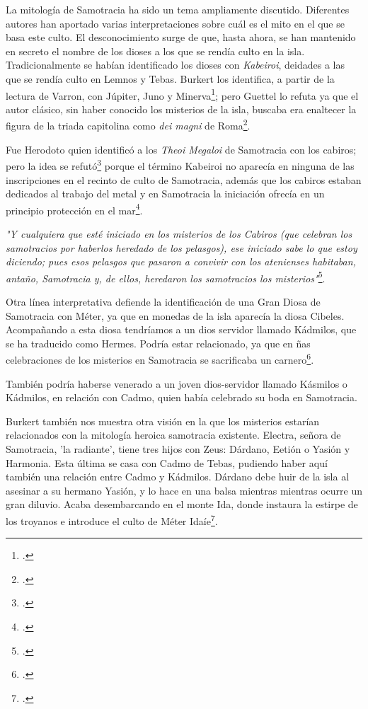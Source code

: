 La mitología de Samotracia ha sido un tema ampliamente discutido. Diferentes autores han aportado varias interpretaciones sobre cuál es el mito en el que se basa este culto. El desconocimiento surge de que, hasta ahora, se han mantenido en secreto  el nombre de los dioses a los que se rendía culto en la isla. Tradicionalmente se habían identificado los dioses con \textit{Kabeiroi}, deidades a las que se rendía culto en Lemnos y Tebas. 
Burkert los identifica, a partir de la lectura de Varron, con Júpiter, Juno y Minerva\footcite[377]{burkertReligionGriegaArcaica2007}; pero Guettel lo refuta ya que el autor clásico, sin haber conocido los misterios de la isla, buscaba era enaltecer la figura de la triada capitolina como \textit{dei magni} de Roma\footcite[2-3]{guettelcoleTheoiMegaloiCult1984}.

Fue Herodoto quien identificó a los \textit{Theoi Megaloi} de Samotracia con los cabiros; pero la idea se refutó\footcite[377]{burkertReligionGriegaArcaica2007} porque el término Kabeiroi no aparecía en ninguna de las inscripciones en el recinto de culto de Samotracia, además que los cabiros estaban dedicados al trabajo del metal y en Samotracia la iniciación ofrecía en un principio protección en el mar\footcite[2-3]{guettelcoleTheoiMegaloiCult1984}.

\textit{"Y cualquiera que esté iniciado en los misterios de los Cabiros (que celebran los samotracios por haberlos heredado de los pelasgos), ese iniciado sabe lo que estoy diciendo; pues esos pelasgos que pasaron a convivir con los atenienses habitaban, antaño, Samotracia y, de ellos, heredaron los samotracios los misterios"}\footcite[341]{herodotoHistoriaLibroII1992}.

Otra línea interpretativa defiende la identificación de una Gran Diosa de Samotracia con Méter, ya que en monedas de la isla aparecía la diosa Cibeles. Acompañando a esta diosa tendríamos a un dios servidor llamado Kádmilos, que se ha traducido como Hermes. Podría estar relacionado, ya que en ñas celebraciones de los misterios en Samotracia se sacrificaba un carnero\footcite[378]{burkertReligionGriegaArcaica2007}.

También podría haberse venerado a un joven dios-servidor llamado Kásmilos o Kádmilos, en relación con Cadmo, quien había celebrado su boda en Samotracia.

Burkert también nos muestra otra visión en la que los misterios estarían relacionados con la mitología heroica samotracia existente. Electra, señora de Samotracia, 'la radiante', tiene tres hijos con Zeus: Dárdano, Eetión o Yasión y Harmonia. Esta última se casa con Cadmo de Tebas, pudiendo haber aquí también una relación entre Cadmo y Kádmilos. Dárdano debe huir de la isla al asesinar a su hermano Yasión, y lo hace en una balsa mientras mientras ocurre un gran diluvio. Acaba desembarcando en el monte Ida, donde instaura la estirpe de los troyanos e introduce el culto de Méter Idaíe\footcite[378]{burkertReligionGriegaArcaica2007}.


